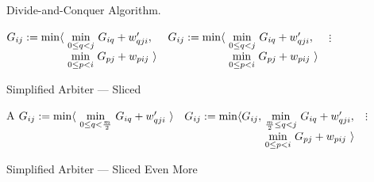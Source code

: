 \begin{paragraph}{Divide-and-Conquer Algorithm.}

\begin{algorithm}
\renewcommand\arraystretch{1.3}
\begin{algorithmic}
      
      \State $G_{ij} :=
        \begin{array}[t]{@{}l@{~}l} 
          \min\langle & \underset{0\leq q<j}\min ~ G_{iq} + \yw{qji}, \\
                      & \underset{0\leq p<i}\min ~ G_{pj} + \xw{pij}~\rangle \\         
        \end{array}$
    \EndFor
  \EndFor
      
      \State $G_{ij} :=
        \begin{array}[t]{@{}l@{~}l} 
          \min\langle & \underset{0\leq q<j}\min ~ G_{iq} + \yw{qji}, \\
                      & \underset{0\leq p<i}\min ~ G_{pj} + \xw{pij}~\rangle \\         
        \end{array}$
    \EndFor
  \EndFor
  \State $\vdots$ 
\end{algorithmic}
\caption{\label{intro:breakdown}
   Simplified Arbiter --- Sliced}
\end{algorithm}


\begin{algorithm}
\renewcommand\arraystretch{1.3}
\begin{algorithmic}
  \State A 
      
      \State $G_{ij} :=
        \begin{array}[t]{@{}l@{~}l} 
          \min\langle & \underset{0\leq q<\frac{m}{2}}\min ~ G_{iq} + \yw{qji}~\rangle \\         
        \end{array}$
    \EndFor
  \EndFor
      \State $G_{ij} :=
        \begin{array}[t]{@{}l@{~}l} 
          \min\langle G_{ij}, & \underset{\frac{m}{2}\leq q<j}\min ~ G_{iq} + \yw{qji}, \\
                      & \underset{0\leq p<i}\min ~ G_{pj} + \xw{pij}~\rangle \\         
        \end{array}$
    \EndFor
  \EndFor
  \State $\vdots$
\end{algorithmic}
\caption{\label{intro:further-breakdown}
   Simplified Arbiter --- Sliced Even More}
\end{algorithm}



\end{paragraph}
